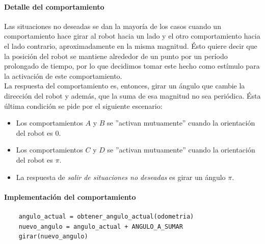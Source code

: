 \paragraph{Detalle del comportamiento}
Las situaciones no deseadas se dan la mayor\'ia de los casos cuando un comportamiento
hace girar al robot hacia un lado y el otro comportamiento hacia el lado contrario,
aproximadamente en la misma magnitud. \'Esto quiere decir que la posici\'on del
robot se mantiene alrededor de un punto por un per\'iodo prolongado de tiempo,
por lo que decidimos tomar este hecho como est\'imulo para la activaci\'on de este
comportamiento.
\\
La respuesta del comportamiento es, entonces, girar un \'angulo que cambie
la direcci\'on del robot y adem\'as, que la suma de esa magnitud no sea peri\'odica.
\'Esta \'ultima condici\'on se pide por el siguiente escenario:
\begin{itemize}
	\item Los comportamientos $A$ y $B$ se ''activan mutuamente'' cuando la orientaci\'on
			del robot es $0$.
	\item Los comportamientos $C$ y $D$ se ''activan mutuamente'' cuando la orientaci\'on
			del robot es $\pi$.
	\item La respuesta de \emph{salir de situaciones no deseadas} es girar un \'angulo $\pi$.
\end{itemize}

\paragraph{Implementaci\'on del comportamiento}
\begin{verbatim}
    angulo_actual = obtener_angulo_actual(odometria)
	nuevo_angulo = angulo_actual + ANGULO_A_SUMAR
	girar(nuevo_angulo)
\end{verbatim}

